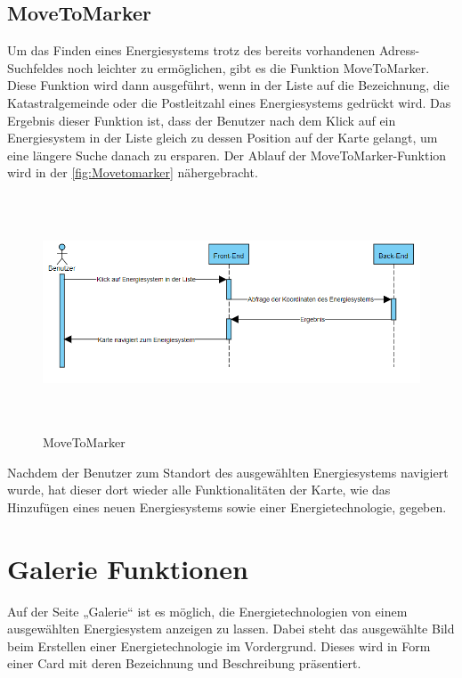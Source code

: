 \subsection{MoveToMarker}
Um das Finden eines Energiesystems trotz des bereits vorhandenen Adress-Suchfeldes noch leichter zu ermöglichen, gibt es die Funktion MoveToMarker. Diese Funktion wird dann ausgeführt, wenn in der Liste auf die Bezeichnung, die Katastralgemeinde oder die Postleitzahl eines Energiesystems gedrückt wird. Das Ergebnis dieser Funktion ist, dass der Benutzer nach dem Klick auf ein Energiesystem in der Liste gleich zu dessen Position auf der Karte gelangt, um eine längere Suche danach zu ersparen. Der Ablauf der MoveToMarker-Funktion wird in der \autoref{fig:Movetomarker} nähergebracht.

\begin{figure}[h]
	\centering
	\includegraphics[height=7cm,width=14cm]{images/MoveToMarker}
	\caption{MoveToMarker}
	\label{fig:Movetomarker}
\end{figure}

Nachdem der Benutzer zum Standort des ausgewählten Energiesystems navigiert wurde, hat dieser dort wieder alle Funktionalitäten der Karte, wie das Hinzufügen eines neuen Energiesystems sowie einer Energietechnologie, gegeben.


\newpage
\section{Galerie Funktionen}
Auf der Seite „Galerie“ ist es möglich, die Energietechnologien von einem ausgewählten Energiesystem anzeigen zu lassen. Dabei steht das ausgewählte Bild beim Erstellen einer Energietechnologie im Vordergrund. Dieses wird in Form einer Card mit deren Bezeichnung und Beschreibung präsentiert.



